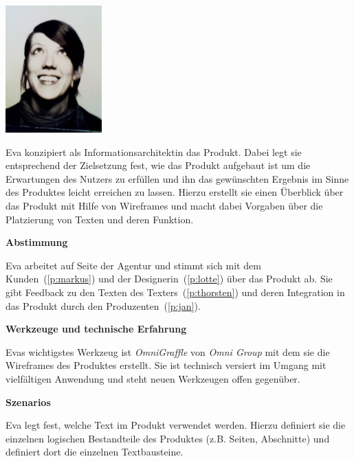 \begin{multicols}{2}

\includegraphics[width=0.5\columnwidth]{media/eva.jpg}


Eva konzipiert als Informationsarchitektin das Produkt. Dabei legt sie entsprechend der Zielsetzung fest, wie das Produkt aufgebaut ist um die Erwartungen des Nutzers zu erfüllen und ihn das gewünschten Ergebnis im Sinne des Produktes leicht erreichen zu lassen. Hierzu erstellt sie einen Überblick über das Produkt mit Hilfe von Wireframes und macht dabei Vorgaben über die Platzierung von Texten und deren Funktion.

\textbf{Abstimmung}

Eva arbeitet auf Seite der Agentur und stimmt sich mit dem Kunden~(\ref{p:markus}) und der Designerin~(\ref{p:lotte}) über das Produkt ab. Sie gibt Feedback zu den Texten des Texters~(\ref{p:thorsten}) und deren Integration in das Produkt durch den Produzenten~(\ref{p:jan}).

\textbf{Werkzeuge und technische Erfahrung}

Evas wichtigstes Werkzeug ist \emph{OmniGraffle} von \emph{Omni Group} mit dem sie die Wireframes des Produktes erstellt. Sie ist technisch versiert im Umgang mit vielfältigen Anwendung und steht neuen Werkzeugen offen gegenüber.

\columnbreak

\textbf{Szenarios}

Eva legt fest, welche Text im Produkt verwendet werden. Hierzu definiert sie die einzelnen logischen Bestandteile des Produktes (z.B. Seiten, Abschnitte) und definiert dort die einzelnen Textbausteine.


\end{multicols}
